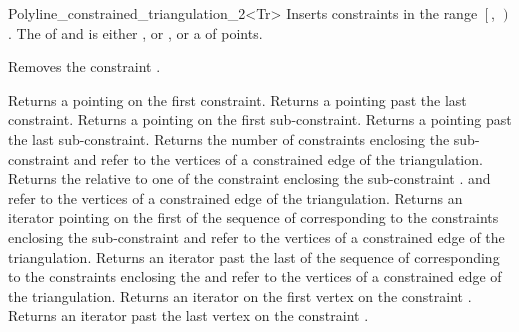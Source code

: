 \begin{ccRefClass}{Polyline_constrained_triangulation_2<Tr>}
{ Inserts constraints in the range
$\left[\right.$, $\left.\right)$.
\ccPrecond The  of  and 
 is either , or , or a  of points.}

{Removes the constraint .}


{Returns a  pointing on the first
constraint.}
\ccGlue
{}
{Returns a  pointing past the last
constraint.}
\ccGlue
{}
{Returns a  pointing on the first
sub-constraint.}
\ccGlue
{}
{Returns a  pointing past the last
sub-constraint.}
\ccGlue
{}
{Returns the number of constraints enclosing the sub-constraint
\ccPrecond {} and  refer to  the vertices
of a constrained edge of the triangulation.}
\ccGlue
{}
{Returns the   relative to  one of the constraint 
enclosing  the sub-constraint  .
\ccPrecond {} and  refer to  the vertices
of a constrained edge of the triangulation.}
\ccGlue
{}
{Returns an iterator pointing on the first 
of the sequence of 
corresponding to the constraints enclosing the sub-constraint
\ccPrecond {} and  refer to  the vertices
of a constrained edge of the triangulation.}
\ccGlue
{}
{Returns an iterator past the last  
of the sequence of 
corresponding to the constraints enclosing the  
\ccPrecond {} and  refer to  the vertices
of a constrained edge of the triangulation.}
\ccGlue
{}
{Returns an iterator on the first vertex on the constraint
.}
\ccGlue
{}
{Returns an iterator past the last vertex on  the constraint
.}


\end{ccRefClass}
